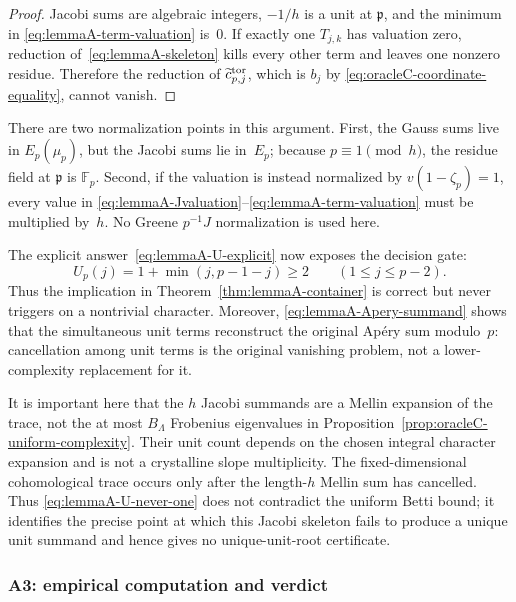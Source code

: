 \begin{proof}
Jacobi sums are algebraic integers, $-1/h$ is a unit at
$\mathfrak p$, and the minimum in
\eqref{eq:lemmaA-term-valuation} is~$0$.  If exactly one $T_{j,k}$ has
valuation zero, reduction of~\eqref{eq:lemmaA-skeleton} kills every
other term and leaves one nonzero residue.  Therefore the reduction of
$\widetilde c_{p,j}^{\rm tor}$, which is $b_j$ by
\eqref{eq:oracleC-coordinate-equality}, cannot vanish.
\end{proof}

There are two normalization points in this argument.  First, the Gauss
sums live in $E_p(\mu_p)$, but the Jacobi sums lie in~$E_p$; because
$p\equiv1\pmod h$, the residue field at $\mathfrak p$ is
$\mathbb F_p$.  Second, if the valuation is instead normalized by
$v(1-\zeta_p)=1$, every value in
\eqref{eq:lemmaA-Jvaluation}--\eqref{eq:lemmaA-term-valuation} must be
multiplied by~$h$.  No Greene $p^{-1}J$ normalization is used here.

The explicit answer~\eqref{eq:lemmaA-U-explicit} now exposes the
decision gate:
\begin{equation}
 U_p(j)=1+\min(j,p-1-j)\geq2
 \qquad(1\leq j\leq p-2).
 \label{eq:lemmaA-U-never-one}
\end{equation}
Thus the implication in Theorem~\ref{thm:lemmaA-container} is correct
but never triggers on a nontrivial character.  Moreover,
\eqref{eq:lemmaA-Apery-summand} shows that the simultaneous unit terms
reconstruct the original Ap\'ery sum modulo~$p$: cancellation among
unit terms is the original vanishing problem, not a lower-complexity
replacement for it.

It is important here that the $h$ Jacobi summands are a Mellin expansion
of the trace, not the at most $B_\Lambda$ Frobenius eigenvalues in
Proposition~\ref{prop:oracleC-uniform-complexity}.  Their unit count
depends on the chosen integral character expansion and is not a
crystalline slope multiplicity.  The fixed-dimensional cohomological
trace occurs only after the length-$h$ Mellin sum has cancelled.  Thus
\eqref{eq:lemmaA-U-never-one} does not contradict the uniform Betti
bound; it identifies the precise point at which this Jacobi skeleton
fails to produce a unique unit summand and hence gives no
unique-unit-root certificate.

\subsubsection{A3: empirical computation and verdict}

